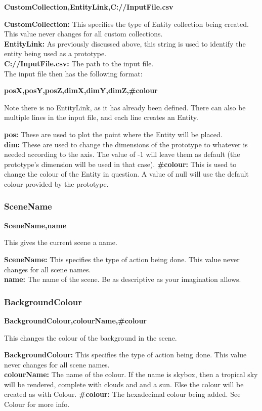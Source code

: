 \documentclass[a4paper,12pt]{article}
\begin{document}
\textbf{CustomCollection,EntityLink,C://InputFile.csv}

\textbf{CustomCollection:} This specifies the type of Entity collection being created. This value never changes for all custom collections.\\
\textbf{EntityLink:} As previously discussed above, this string is used to identify the entity being used as a prototype.\\
\textbf{C://InputFile.csv:} The path to the input file.\\

The input file then has the following format:

\textbf{posX,posY,posZ,dimX,dimY,dimZ,\#colour}

Note there is no EntityLink, as it has already been defined. There can also be multiple lines in the input file, and each line creates an Entity.

\textbf{pos:} These are used to plot the point where the Entity will be placed.\\
\textbf{dim:} These are used to change the dimensions of the prototype to whatever is needed according to the axis. The value of -1 will leave them as default (the prototype's dimension will be used in that case).
\textbf{\#colour:} This is used to change the colour of the Entity in question. A value of null will use the default colour provided by the prototype.

\subsubsection{SceneName}

\textbf{SceneName,name}

This gives the current scene a name.

\textbf{SceneName:} This specifies the type of action being done. This value never changes for all scene names.\\
\textbf{name:} The name of the scene. Be as descriptive as your imagination allows.

\subsubsection{BackgroundColour}

\textbf{BackgroundColour,colourName,\#colour}

This changes the colour of the background in the scene.

\textbf{BackgroundColour:} This specifies the type of action being done. This value never changes for all scene names.\\
\textbf{colourName:} The name of the colour. If the name is skybox, then a tropical sky will be rendered, complete with clouds and and a sun. Else the colour will be created as with Colour.
\textbf{\#colour:} The hexadecimal colour being added. See Colour for more info.
\end{document}
